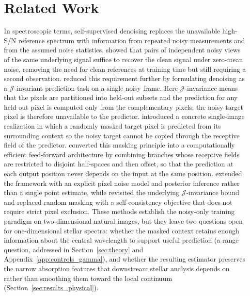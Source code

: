 \documentclass[twocolumn]{aastex7}
\begin{document}
\section{Related Work}
\label{sec:related_work}
In spectroscopic terms, self-supervised denoising replaces the unavailable high-S/N reference spectrum with information from repeated noisy measurements and from the assumed noise statistics. \citet{lehtinen2018noise2noise} showed that pairs of independent noisy views of the same underlying signal suffice to recover the clean signal under zero-mean noise, removing the need for clean references at training time but still requiring a second observation. \citet{batson2019noise2self} reduced this requirement further by formulating denoising as a $\mathcal{J}$-invariant prediction task on a single noisy frame. Here $\mathcal{J}$-invariance means that the pixels are partitioned into held-out subsets and the prediction for any held-out pixel is computed only from the complementary pixels; the noisy target pixel is therefore unavailable to the predictor. \citet{Krull2019_blindspot} introduced a concrete single-image realization in which a randomly masked target pixel is predicted from its surrounding context so the noisy target cannot be copied through the receptive field of the predictor. \citet{Laine2019_BSN} converted this masking principle into a computationally efficient feed-forward architecture by combining branches whose receptive fields are restricted to disjoint half-spaces and then offset, so that the prediction at each output position never depends on the input at the same position. \citet{Krull2020_PN2V} extended the framework with an explicit pixel noise model and posterior inference rather than a single point estimate, while \citet{Xie2020_Noise2Same} revisited the underlying $\mathcal{J}$-invariance bound and replaced random masking with a self-consistency objective that does not require strict pixel exclusion. These methods establish the noisy-only training paradigm on two-dimensional natural images, but they leave two questions open for one-dimensional stellar spectra: whether the masked context retains enough information about the central wavelength to support useful prediction (a range question, addressed in Section~\ref{sec:theory} and Appendix~\ref{app:controls_gamma}), and whether the resulting estimator preserves the narrow absorption features that downstream stellar analysis depends on rather than smoothing them toward the local continuum (Section~\ref{sec:results_physical}).
\end{document}
